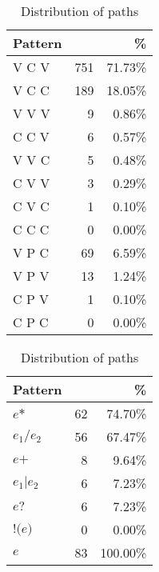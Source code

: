 \documentclass[runningheads]{llncs}
\newcommand{\ntextnumero}{{\fontfamily{txr}\selectfont \textnumero}\xspace}
\begin{document}
\begin{table}[t]
	\begin{minipage}[b]{0.47\linewidth}
		\centering
		\caption{Distribution of triple patterns (C: Constant, V: Variable, P: Path). \label{tab:Pattern}}
		\begin{tabular}{lrr}    \toprule
			\textbf{Pattern} & \textbf{\ntextnumero} & \textbf{\%} \\    \midrule
			V C V   & 751      & 71.73\%    \\
			V C C   & 189      & 18.05\%    \\
			V V V   & 9        & 0.86\%     \\
			C C V   & 6        & 0.57\%     \\
			V V C   & 5        & 0.48\%     \\
			C V V   & 3        & 0.29\%     \\
			C V C   & 1        & 0.10\%      \\
			C C C   & 0        & 0.00\%        \\    \midrule
			V P C   & 69       & 6.59\%     \\
			V P V   & 13       & 1.24\%     \\
			C P V   & 1        & 0.10\%      \\
			C P C   & 0        & 0.00\%        \\    \bottomrule
		\end{tabular}
	\end{minipage}
	\hfill
	\begin{minipage}[b]{0.47\linewidth}
		\centering
		\caption{Distribution of paths\label{tab:Path}}
		\begin{tabular}{lrr}    \toprule
			\textbf{Pattern}      & \textbf{\ntextnumero} & \textbf{\%} \\    \midrule
			$e\texttt{*}$   & 62       & 74.70\%     \\
			$e_1 \texttt{/} e_2$  & 56       & 67.47\%    \\
			$e\texttt{+} $   & 8        & 9.64\%     \\
			$e_1 \texttt{|} e_2$  & 6        & 7.23\%     \\
			$e\texttt{?}$    & 6        & 7.23\%     \\
			$\texttt{!(}e\texttt{)}$ & 0        & 0.00\%        \\ \midrule
			$e$ & 83 & 100.00\% \\
			\bottomrule
		\end{tabular}
	\end{minipage}
\end{table}
\end{document}
